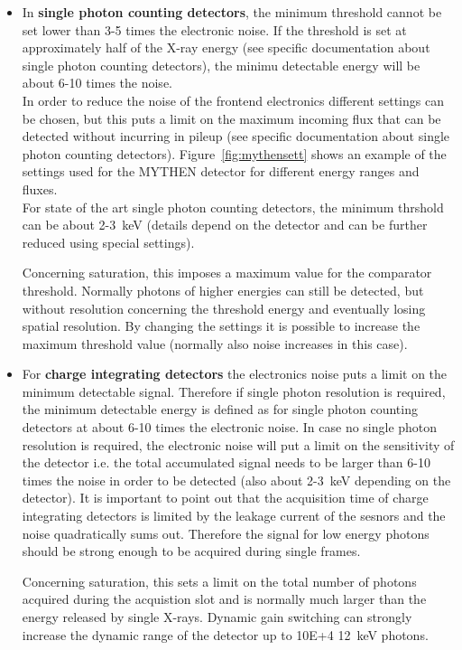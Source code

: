 \begin{itemize}
\item In \textbf{single photon counting detectors}, the minimum threshold  cannot be set lower than 3-5 times the electronic noise.
If the threshold is set at approximately half of the X-ray energy (see specific documentation about single photon counting detectors), the minimu detectable energy will be about 6-10 times the noise.\\
In order to reduce the noise of the frontend electronics different settings can be chosen, but this puts a limit on the maximum incoming flux that can be detected without incurring in pileup (see specific documentation about single photon counting detectors). Figure~\ref{fig:mythensett} shows an example of the settings used for the MYTHEN detector for different energy ranges and fluxes.\\
For state of the art single photon counting detectors, the minimum thrshold can be about 2-3~keV (details depend on the detector and can be further reduced using special settings).

Concerning saturation, this imposes a maximum value for the comparator threshold. Normally photons of higher energies can still be detected, but without resolution concerning the threshold energy and eventually losing spatial resolution.
By changing the settings it is possible to increase the maximum threshold value (normally also noise increases in this case).

\item For \textbf{charge integrating detectors} the electronics noise puts a limit on the minimum detectable signal. Therefore if single photon resolution is required, the minimum detectable energy is defined as for single photon counting detectors at about 6-10 times the electronic noise. In case no single photon resolution is required, the electronic noise will put a limit on the sensitivity of the detector i.e. the total accumulated signal needs to be larger than 6-10 times the noise in order to be detected (also about 2-3~keV depending on the detector). It is important to point out that the acquisition time of charge integrating detectors is limited by the leakage current of the sesnors and the noise quadratically sums out. Therefore the signal for low energy photons should be strong enough to be acquired during single frames.

Concerning saturation, this sets a limit on the total number of photons acquired during the acquistion slot and is normally much larger than the energy released by single X-rays. Dynamic gain switching can strongly increase the dynamic range of the detector up to 10E+4 12~keV photons. 


\end{itemize}


